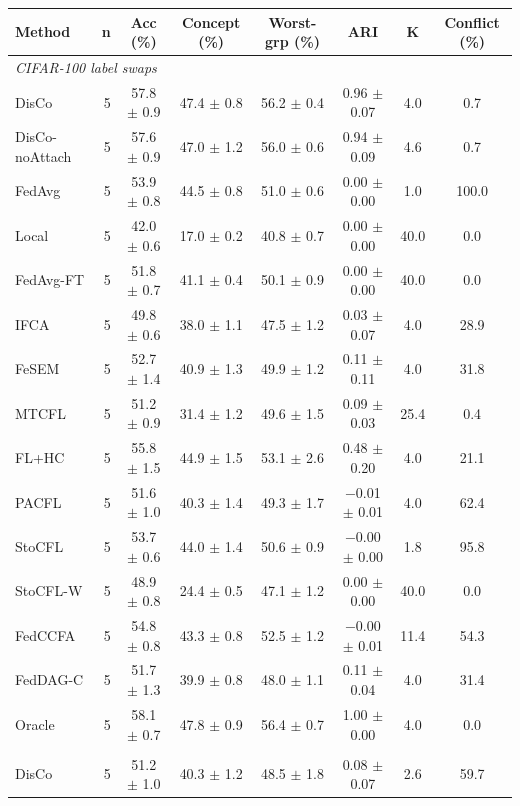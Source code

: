 {\scriptsize
\begin{tabular}{l r c c c c c c}
\toprule
Method & n & Acc (\%) & Concept (\%) & Worst-grp (\%) & ARI & K & Conflict (\%) \\
\midrule
\multicolumn{8}{l}{\textit{CIFAR-100 label swaps}} \\
DisCo & 5 & 57.8 $\pm$ 0.9 & 47.4 $\pm$ 0.8 & 56.2 $\pm$ 0.4 & 0.96 $\pm$ 0.07 & 4.0 & 0.7 \\
DisCo-noAttach & 5 & 57.6 $\pm$ 0.9 & 47.0 $\pm$ 1.2 & 56.0 $\pm$ 0.6 & 0.94 $\pm$ 0.09 & 4.6 & 0.7 \\
FedAvg & 5 & 53.9 $\pm$ 0.8 & 44.5 $\pm$ 0.8 & 51.0 $\pm$ 0.6 & 0.00 $\pm$ 0.00 & 1.0 & 100.0 \\
Local & 5 & 42.0 $\pm$ 0.6 & 17.0 $\pm$ 0.2 & 40.8 $\pm$ 0.7 & 0.00 $\pm$ 0.00 & 40.0 & 0.0 \\
FedAvg-FT & 5 & 51.8 $\pm$ 0.7 & 41.1 $\pm$ 0.4 & 50.1 $\pm$ 0.9 & 0.00 $\pm$ 0.00 & 40.0 & 0.0 \\
IFCA & 5 & 49.8 $\pm$ 0.6 & 38.0 $\pm$ 1.1 & 47.5 $\pm$ 1.2 & 0.03 $\pm$ 0.07 & 4.0 & 28.9 \\
FeSEM & 5 & 52.7 $\pm$ 1.4 & 40.9 $\pm$ 1.3 & 49.9 $\pm$ 1.2 & 0.11 $\pm$ 0.11 & 4.0 & 31.8 \\
MTCFL & 5 & 51.2 $\pm$ 0.9 & 31.4 $\pm$ 1.2 & 49.6 $\pm$ 1.5 & 0.09 $\pm$ 0.03 & 25.4 & 0.4 \\
FL+HC & 5 & 55.8 $\pm$ 1.5 & 44.9 $\pm$ 1.5 & 53.1 $\pm$ 2.6 & 0.48 $\pm$ 0.20 & 4.0 & 21.1 \\
PACFL & 5 & 51.6 $\pm$ 1.0 & 40.3 $\pm$ 1.4 & 49.3 $\pm$ 1.7 & $-$0.01 $\pm$ 0.01 & 4.0 & 62.4 \\
StoCFL & 5 & 53.7 $\pm$ 0.6 & 44.0 $\pm$ 1.4 & 50.6 $\pm$ 0.9 & $-$0.00 $\pm$ 0.00 & 1.8 & 95.8 \\
StoCFL-W & 5 & 48.9 $\pm$ 0.8 & 24.4 $\pm$ 0.5 & 47.1 $\pm$ 1.2 & 0.00 $\pm$ 0.00 & 40.0 & 0.0 \\
FedCCFA & 5 & 54.8 $\pm$ 0.8 & 43.3 $\pm$ 0.8 & 52.5 $\pm$ 1.2 & $-$0.00 $\pm$ 0.01 & 11.4 & 54.3 \\
FedDAG-C & 5 & 51.7 $\pm$ 1.3 & 39.9 $\pm$ 0.8 & 48.0 $\pm$ 1.1 & 0.11 $\pm$ 0.04 & 4.0 & 31.4 \\
Oracle & 5 & 58.1 $\pm$ 0.7 & 47.8 $\pm$ 0.9 & 56.4 $\pm$ 0.7 & 1.00 $\pm$ 0.00 & 4.0 & 0.0 \\
\addlinespace
\multicolumn{8}{l}{\textit{CIFAR-100 rotations}} \\
DisCo & 5 & 51.2 $\pm$ 1.0 & 40.3 $\pm$ 1.2 & 48.5 $\pm$ 1.8 & 0.08 $\pm$ 0.07 & 2.6 & 59.7 \\

\end{tabular}}
